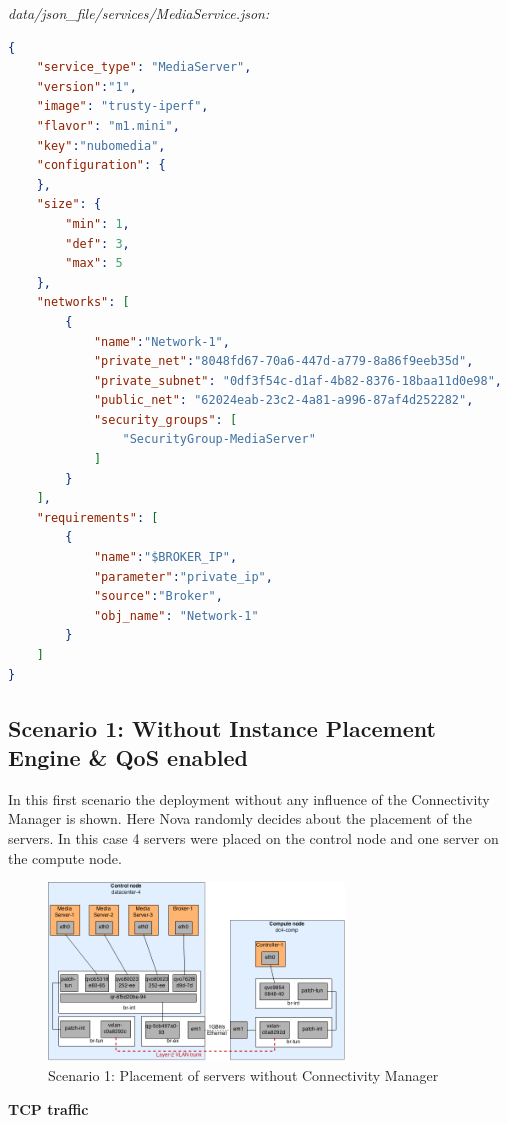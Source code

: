 \textit{data/json\_file/services/MediaService.json:}
\begin{lstlisting}[language=json,firstnumber=1]
{
    "service_type": "MediaServer",
    "version":"1",
    "image": "trusty-iperf",
    "flavor": "m1.mini",
    "key":"nubomedia",
    "configuration": {
    },
    "size": {
        "min": 1,
        "def": 3,
        "max": 5
    },
    "networks": [
        {
            "name":"Network-1",
            "private_net":"8048fd67-70a6-447d-a779-8a86f9eeb35d",
            "private_subnet": "0df3f54c-d1af-4b82-8376-18baa11d0e98",
            "public_net": "62024eab-23c2-4a81-a996-87af4d252282",
            "security_groups": [
                "SecurityGroup-MediaServer"
            ]
        }
    ],
    "requirements": [
        {
            "name":"$BROKER_IP",
            "parameter":"private_ip",
            "source":"Broker",
            "obj_name": "Network-1"
        }
    ]
}
\end{lstlisting}

\subsection{Scenario 1: Without Instance Placement Engine \& QoS enabled}

In this first scenario the deployment without any influence of the Connectivity Manager is shown. Here Nova randomly decides about the placement of the servers. In this case 4 servers were placed on the control node and one server on the compute node.

\begin{figure}[H]
\centering

\includegraphics[width=0.7\textwidth]{images/evaluation/testbed_scenario1}

\caption{Scenario 1: Placement of servers without Connectivity Manager}
\end{figure}

\textbf{TCP traffic}

